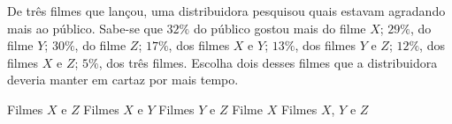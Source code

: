 De três filmes que lançou, uma distribuidora pesquisou quais estavam agradando mais ao público. Sabe-se que $32\%$ do público gostou mais do filme $X$; $29\%$, do filme $Y$; $30\%$, do filme $Z$; $17\%$, dos filmes $X$ e $Y$; $13\%$, dos filmes $Y$ e $Z$; $12\%$, dos filmes $X$ e $Z$; $5\%$, dos três filmes. Escolha dois desses filmes que a distribuidora deveria manter em cartaz por mais tempo.

Filmes $X$ e $Z$
Filmes $X$ e $Y$
Filmes $Y$ e $Z$
Filme $X$
Filmes $X$, $Y$ e $Z$





